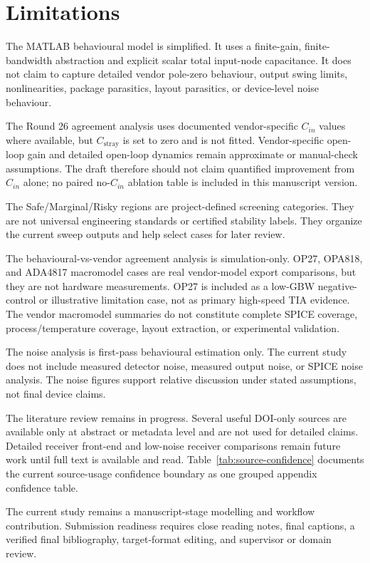 \section{Limitations}

The MATLAB behavioural model is simplified. It uses a finite-gain, finite-bandwidth abstraction and explicit scalar total input-node capacitance. It does not claim to capture detailed vendor pole-zero behaviour, output swing limits, nonlinearities, package parasitics, layout parasitics, or device-level noise behaviour.

The Round 26 agreement analysis uses documented vendor-specific $C_{in}$ values where available, but $C_{\mathrm{stray}}$ is set to zero and is not fitted. Vendor-specific open-loop gain and detailed open-loop dynamics remain approximate or manual-check assumptions. The draft therefore should not claim quantified improvement from $C_{in}$ alone; no paired no-$C_{in}$ ablation table is included in this manuscript version.

The Safe/Marginal/Risky regions are project-defined screening categories. They are not universal engineering standards or certified stability labels. They organize the current sweep outputs and help select cases for later review.

The behavioural-vs-vendor agreement analysis is simulation-only. OP27, OPA818, and ADA4817 macromodel cases are real vendor-model export comparisons, but they are not hardware measurements. OP27 is included as a low-GBW negative-control or illustrative limitation case, not as primary high-speed TIA evidence. The vendor macromodel summaries do not constitute complete SPICE coverage, process/temperature coverage, layout extraction, or experimental validation.

The noise analysis is first-pass behavioural estimation only. The current study does not include measured detector noise, measured output noise, or SPICE noise analysis. The noise figures support relative discussion under stated assumptions, not final device claims.

The literature review remains in progress. Several useful DOI-only sources are available only at abstract or metadata level and are not used for detailed claims. Detailed receiver front-end and low-noise receiver comparisons remain future work until full text is available and read. Table~\ref{tab:source-confidence} documents the current source-usage confidence boundary as one grouped appendix confidence table.

The current study remains a manuscript-stage modelling and workflow contribution. Submission readiness requires close reading notes, final captions, a verified final bibliography, target-format editing, and supervisor or domain review.

